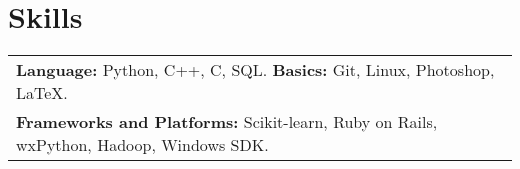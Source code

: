 \documentclass[a4paper,10pt]{article}
\begin{document}
\vspace{-0.2cm}
\section{Skills}
\vspace{-0.2cm}


\begin{tabular}{p{18cm}}
\textbf{Language:} Python, C++, C, SQL. { }{ } \textbf{Basics:} Git, Linux, Photoshop, \LaTeX. \\
\textbf{Frameworks and Platforms:} Scikit-learn, Ruby on Rails, wxPython, Hadoop, Windows SDK.  \\
\end{tabular}





\end{document}
